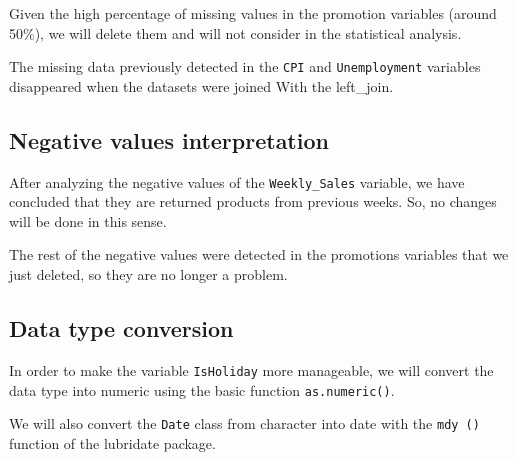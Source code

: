 \documentclass[11pt,]{article}
\newenvironment{Shaded}{\begin{snugshade}}{\end{snugshade}}
\newcommand{\KeywordTok}[1]{\textcolor[rgb]{0.13,0.29,0.53}{\textbf{{#1}}}}
\newcommand{\StringTok}[1]{\textcolor[rgb]{0.31,0.60,0.02}{{#1}}}
\newcommand{\CommentTok}[1]{\textcolor[rgb]{0.56,0.35,0.01}{\textit{{#1}}}}
\newcommand{\OtherTok}[1]{\textcolor[rgb]{0.56,0.35,0.01}{{#1}}}
\newcommand{\NormalTok}[1]{{#1}}
\begin{document}
Given the high percentage of missing values in the promotion variables
(around 50\%), we will delete them and will not consider in the
statistical analysis.

\begin{Shaded}
\end{Shaded}

The missing data previously detected in the \texttt{CPI} and
\texttt{Unemployment} variables disappeared when the datasets were
joined With the left\_join.

\subsection{Negative values
interpretation}\label{negative-values-interpretation}

After analyzing the negative values of the \texttt{Weekly\_Sales}
variable, we have concluded that they are returned products from
previous weeks. So, no changes will be done in this sense.

The rest of the negative values were detected in the promotions
variables that we just deleted, so they are no longer a problem.

\subsection{Data type conversion}\label{data-type-conversion}

In order to make the variable \texttt{IsHoliday} more manageable, we
will convert the data type into numeric using the basic function
\texttt{as.numeric()}.

\begin{Shaded}
\end{Shaded}

We will also convert the \texttt{Date} class from character into date
with the \texttt{mdy\ ()} function of the lubridate package.
\end{document}
